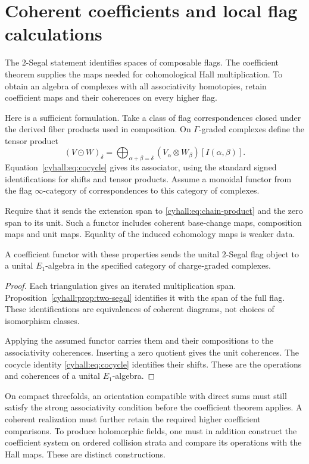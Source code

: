 \section{Coherent coefficients and local flag calculations}
\label{cyhall:sec:coherent}

The $2$-Segal statement identifies spaces of composable flags.
The coefficient theorem supplies the maps needed for cohomological
Hall multiplication. To obtain an algebra of complexes with all
associativity homotopies, retain coefficient maps and their
coherences on every higher flag.

Here is a sufficient formulation. Take a class of flag
correspondences closed under the derived fiber products used in
composition. On $\Gamma$-graded complexes define the tensor product
\[
 (V\mathbin{\odot}W)_\delta=
 \bigoplus_{\alpha+\beta=\delta}
       (V_\alpha\otimes W_\beta)[I(\alpha,\beta)].
\]
Equation~\eqref{cyhall:eq:cocycle} gives its associator, using the
standard signed identifications for shifts and tensor products.
Assume a monoidal functor from the flag
$\infty$-category of correspondences to this category of complexes.

Require that it sends the extension span to
\eqref{cyhall:eq:chain-product} and the zero span to its unit.
Such a functor includes coherent base-change maps, composition
maps and unit maps. Equality of the induced cohomology maps is
weaker data.

\begin{proposition}
\label{cyhall:prop:coherent-realization}
A coefficient functor with these properties sends the unital
$2$-Segal flag object to a unital $E_1$-algebra in the specified
category of charge-graded complexes.
\end{proposition}
\begin{proof}
Each triangulation gives an iterated multiplication span.
Proposition~\ref{cyhall:prop:two-segal} identifies it with the span
of the full flag. These identifications are equivalences of
coherent diagrams, not choices of isomorphism classes.

Applying the assumed functor carries them and their compositions
to the associativity coherences. Inserting a zero quotient gives
the unit coherences. The cocycle identity
\eqref{cyhall:eq:cocycle} identifies their shifts.
These are the operations and coherences of a unital $E_1$-algebra.
\end{proof}

On compact threefolds, an orientation compatible with direct sums
must still satisfy the strong associativity condition before the
coefficient theorem applies. A coherent realization must further
retain the required higher coefficient comparisons.
To produce holomorphic fields, one must in addition construct the
coefficient system on ordered collision strata and compare its
operations with the Hall maps. These are distinct constructions.

